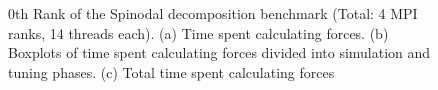 \begin{figure}[h]
    \caption[Spinodal decomposition benchmark MPI with 14 threads]{0th Rank of the Spinodal decomposition benchmark (Total: 4 MPI ranks, 14 threads each). (a) Time spent calculating forces. (b) Boxplots of time spent calculating forces divided into simulation and tuning phases. (c) Total time spent calculating forces}
    \label{fig:spinodal_14thread}
\end{figure}




